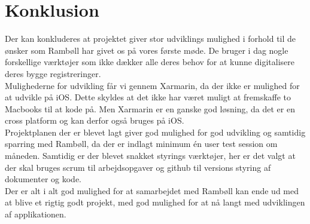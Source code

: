 \chapter{Konklusion}

Der kan konkluderes at projektet giver stor udviklings mulighed i forhold til de ønsker som Rambøll har givet os på vores første møde. De bruger i dag nogle forskellige værktøjer som ikke dækker alle deres behov for at kunne digitalisere deres bygge registreringer. \\
Mulighederne for udvikling får vi gennem Xarmarin, da der ikke er mulighed for at udvikle på iOS. Dette skyldes at det ikke har været muligt at fremskaffe to Macbooks til at kode på. Men Xarmarin er en ganske god løsning, da det er en cross platform og kan derfor også bruges på iOS. \\
Projektplanen der er blevet lagt giver god mulighed for god udvikling og samtidig sparring med Rambøll, da der er indlagt minimum én user test session om måneden. \newline
Samtidig er der blevet snakket styrings værktøjer, her er det valgt at der skal bruges scrum til arbejdsopgaver og github til versions styring af dokumenter og kode.\\
Der er alt i alt god mulighed for at samarbejdet med Rambøll kan ende ud med at blive et rigtig godt projekt, med god mulighed for at nå langt med udviklingen af applikationen. 
